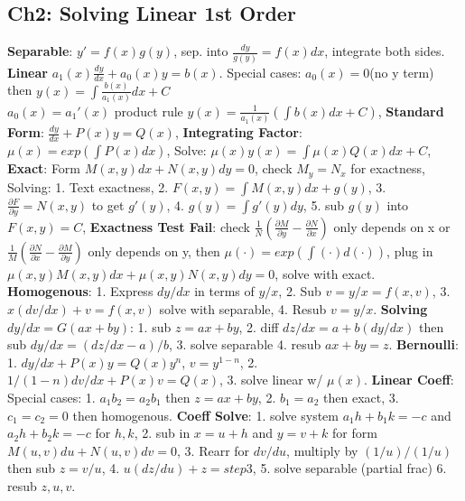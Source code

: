 \subsection*{Ch2: Solving Linear 1st Order}
\textbf{Separable}: $y' = f(x)g(y)$, sep. into $\frac{dy}{g(y)} = f(x)dx$, integrate both sides. \\
\textbf{Linear} $a_1(x)\frac{dy}{dx} + a_0(x)y = b(x)$. Special cases: $a_0(x) = 0$(no y term) then $y(x) = \int \frac{b(x)}{a_1(x)}dx + C$ \\
$a_0(x) = a_1'(x)$ product rule $y(x) = \frac{1}{a_1(x)}(\int b(x)dx + C)$, 
\textbf{Standard Form}: $\frac{dy}{dx} + P(x)y = Q(x)$, \textbf{Integrating Factor}: $\mu(x) = exp(\int P(x)dx)$, 
Solve: $\mu(x)y(x) = \int \mu(x)Q(x)dx + C$, \textbf{Exact}: Form $M(x,y)dx + N(x,y)dy = 0$, check $M_y = N_x$ for exactness, 
Solving: 
1. Text exactness, 
2. $F(x,y) = \int M(x,y)dx + g(y)$, 
3. $\frac{\partial F}{\partial y} = N(x,y)$ to get $g'(y)$,
4. $g(y) = \int g'(y)dy$,
5. sub $g(y)$ into $F(x,y) = C$, 
\textbf{Exactness Test Fail}: check $\frac{1}{N}(\frac{\partial M}{\partial y} - \frac{\partial N}{\partial x})$ only depends on x 
or $\frac{1}{M}(\frac{\partial N}{\partial x} - \frac{\partial M}{\partial y})$ only depends on y, then $\mu(\cdot) = exp(\int (\cdot) d(\cdot))$,
plug in $\mu(x,y)M(x,y)dx + \mu(x,y)N(x,y)dy = 0$, solve with exact. 
\textbf{Homogenous}:
1. Express $dy/dx$ in terms of $y/x$, 
2. Sub $v = y/x = f(x,v)$, 
3. $x(dv/dx) + v = f(x,v)$ solve with separable,
4. Resub $v = y/x$. 
\textbf{Solving $dy/dx = G(ax + by)$}: 
1. sub $z= ax + by$, 
2. diff $dz/dx = a + b(dy/dx)$ then sub $dy/dx = (dz/dx - a)/b$, 
3. solve separable
4. resub $ax + by = z$. 
\textbf{Bernoulli}: 
1. $dy/dx + P(x)y = Q(x)y^n$, $v = y^{1-n}$, 
2. $1/(1-n)dv/dx + P(x)v = Q(x)$, 
3. solve linear w/ $\mu(x)$. 
\textbf{Linear Coeff}: 
Special cases: 
1. $a_1b_2 = a_2b_1$ then $z = ax+by$, 
2. $b_1 = a_2$ then exact, 
3. $c_1 = c_2 = 0$ then homogenous. 
\textbf{Coeff Solve}: 
1. solve system $a_1h + b_1k = -c$ and $a_2h + b_2k = -c$ for $h, k$, 
2. sub in $x = u + h$ and $y = v + k$ for form $M(u, v)du + N(u, v)dv = 0$,
3. Rearr for $dv/du$, multiply by $(1/u)/(1/u)$ then sub $z = v/u$,
4. $u(dz/du) + z = step3$, 
5. solve separable (partial frac)
6. resub $z, u, v$.

